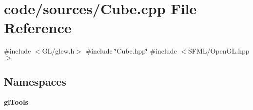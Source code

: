 \section{code/sources/\+Cube.cpp File Reference}
\label{_cube_8cpp}
{\ttfamily \#include $<$G\+L/glew.\+h$>$}\newline
{\ttfamily \#include \char`\"{}Cube.\+hpp\char`\"{}}\newline
{\ttfamily \#include $<$S\+F\+M\+L/\+Open\+G\+L.\+hpp$>$}\newline
\subsection*{Namespaces}
\begin{DoxyCompactItemize}
\item 
 \textbf{ gl\+Tools}
\end{DoxyCompactItemize}
